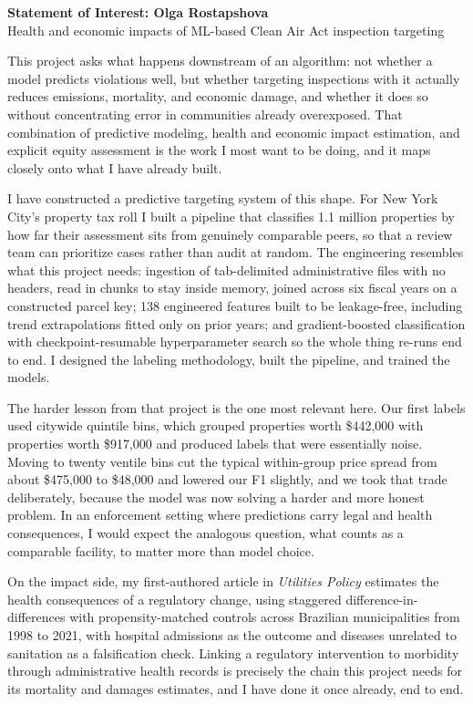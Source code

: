 

\begin{center}{\bfseries\large Statement of Interest: Olga Rostapshova}\\[2pt]
{\small Health and economic impacts of ML-based Clean Air Act inspection targeting}\end{center}
\vspace{6pt}

This project asks what happens downstream of an algorithm: not whether a model predicts violations well, but whether targeting inspections with it actually reduces emissions, mortality, and economic damage, and whether it does so without concentrating error in communities already overexposed. That combination of predictive modeling, health and economic impact estimation, and explicit equity assessment is the work I most want to be doing, and it maps closely onto what I have already built.

I have constructed a predictive targeting system of this shape. For New York City's property tax roll I built a pipeline that classifies 1.1 million properties by how far their assessment sits from genuinely comparable peers, so that a review team can prioritize cases rather than audit at random. The engineering resembles what this project needs: ingestion of tab-delimited administrative files with no headers, read in chunks to stay inside memory, joined across six fiscal years on a constructed parcel key; 138 engineered features built to be leakage-free, including trend extrapolations fitted only on prior years; and gradient-boosted classification with checkpoint-resumable hyperparameter search so the whole thing re-runs end to end. I designed the labeling methodology, built the pipeline, and trained the models.

The harder lesson from that project is the one most relevant here. Our first labels used citywide quintile bins, which grouped properties worth \$442,000 with properties worth \$917,000 and produced labels that were essentially noise. Moving to twenty ventile bins cut the typical within-group price spread from about \$475,000 to \$48,000 and lowered our F1 slightly, and we took that trade deliberately, because the model was now solving a harder and more honest problem. In an enforcement setting where predictions carry legal and health consequences, I would expect the analogous question, what counts as a comparable facility, to matter more than model choice.

On the impact side, my first-authored article in \textit{Utilities Policy} estimates the health consequences of a regulatory change, using staggered difference-in-differences with propensity-matched controls across Brazilian municipalities from 1998 to 2021, with hospital admissions as the outcome and diseases unrelated to sanitation as a falsification check. Linking a regulatory intervention to morbidity through administrative health records is precisely the chain this project needs for its mortality and damages estimates, and I have done it once already, end to end.

